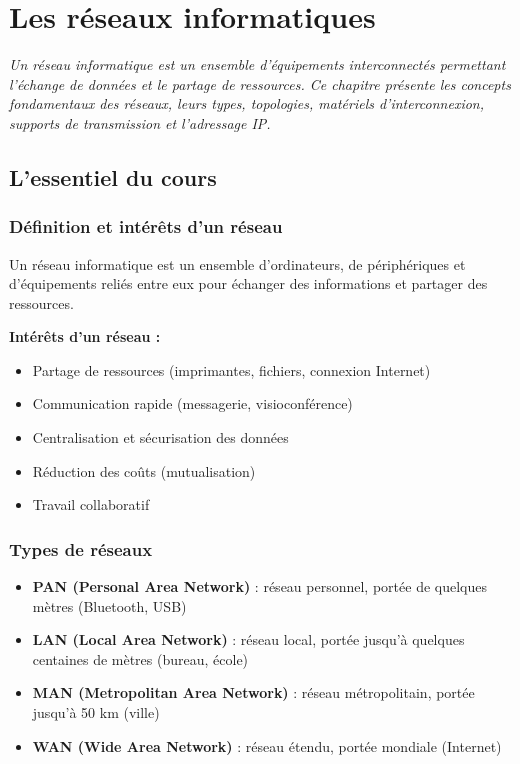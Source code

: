 \chapter{Les réseaux informatiques}
\textit{Un réseau informatique est un ensemble d'équipements interconnectés permettant l'échange de données et le partage de ressources. Ce chapitre présente les concepts fondamentaux des réseaux, leurs types, topologies, matériels d'interconnexion, supports de transmission et l'adressage IP.}

\section{L'essentiel du cours}

\subsection{Définition et intérêts d'un réseau}
\begin{definition}
Un réseau informatique est un ensemble d'ordinateurs, de périphériques et d'équipements reliés entre eux pour échanger des informations et partager des ressources.
\end{definition}

\begin{aretenir}
\textbf{Intérêts d'un réseau :}
\begin{itemize}
    \item Partage de ressources (imprimantes, fichiers, connexion Internet)
    \item Communication rapide (messagerie, visioconférence)
    \item Centralisation et sécurisation des données
    \item Réduction des coûts (mutualisation)
    \item Travail collaboratif
\end{itemize}
\end{aretenir}

\subsection{Types de réseaux}
\begin{definition}
\begin{itemize}
    \item \textbf{PAN (Personal Area Network)} : réseau personnel, portée de quelques mètres (Bluetooth, USB)
    \item \textbf{LAN (Local Area Network)} : réseau local, portée jusqu'à quelques centaines de mètres (bureau, école)
    \item \textbf{MAN (Metropolitan Area Network)} : réseau métropolitain, portée jusqu'à 50 km (ville)
    \item \textbf{WAN (Wide Area Network)} : réseau étendu, portée mondiale (Internet)
\end{itemize}
\end{definition}

